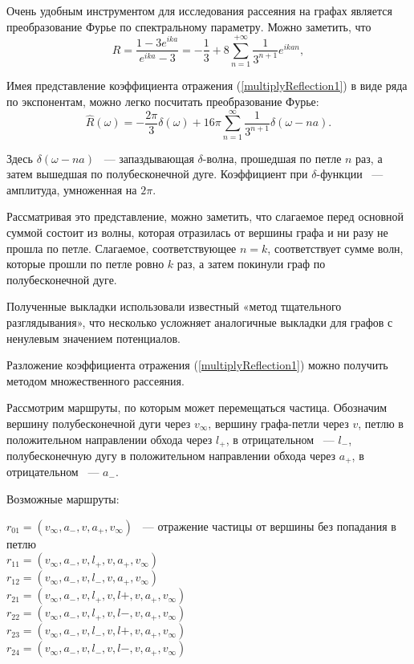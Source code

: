 \documentclass[a4 paper, 12 pt]{extarticle}
\begin{document}
   Очень удобным инструментом для исследования рассеяния на графах является преобразование Фурье по спектральному параметру.
   Можно заметить, что \[  R = \frac{1-3e^{ika}}{e^{ika}-3} = -\frac{1}{3} + 8 \sum_{n=1}^{+\infty}\frac{1}{3^{n+1}}e^{ikan},\]
   
   Имея представление коэффициента отражения (\ref{multiplyReflection1}) в виде ряда по экспонентам, можно легко посчитать преобразование Фурье:
   \[\widehat{R}(\omega)=-\frac{2\pi}{3}\delta(\omega)+16\pi\sum_{n=1}^{\infty}\frac{1}{3^{n+1}}\delta(\omega-na).\]
   
   Здесь $\delta\left(\omega -na\right)$ ~--- запаздывающая $\delta$-волна, прошедшая по петле $n$ раз, а затем вышедшая по полубесконечной дуге. Коэффициент при $\delta$-функции ~--- амплитуда, умноженная на $2\pi$.
   
   Рассматривая это представление, можно заметить, что слагаемое перед основной суммой состоит из волны, которая отразилась от вершины графа и ни разу не прошла по петле. Слагаемое, соответствующее $n=k$, соответствует сумме волн, которые прошли по петле ровно $k$ раз, а затем покинули граф по полубесконечной дуге.
   
   Полученные выкладки использовали известный «метод тщательного разглядывания», что несколько усложняет аналогичные выкладки для графов с ненулевым значением потенциалов.
   \pagebreak
   
   Разложение коэффициента отражения (\ref{multiplyReflection1}) можно получить методом множественного рассеяния.
   
   Рассмотрим маршруты, по которым может перемещаться частица. Обозначим вершину полубесконечной дуги через $v_\infty$, вершину графа-петли через $v$, петлю в положительном направлении обхода через $l_+$, в отрицательном ~--- $l_-$, полубесконечную дугу в положительном направлении обхода через $a_+$, в отрицательном ~--- $a_-$.
   
   Возможные маршруты:

   \begin{table}[!htb]
   	$r_{01} = \left(v_\infty,a_-,v,a_+,v_\infty\right)$ ~--- отражение частицы от вершины без попадания в петлю \\
   	$r_{11} = \left(v_\infty,a_-,v,l_+,v,a_+,v_\infty\right)$ \\
   	$r_{12} = \left(v_\infty,a_-,v,l_-,v,a_+,v_\infty\right)$ \\
   	$r_{21} = \left(v_\infty,a_-,v,l_+,v,l+,v,a_+,v_\infty\right)$ \\
   	$r_{22} = \left(v_\infty,a_-,v,l_+,v,l-,v,a_+,v_\infty\right)$   \\
   	$r_{23} = \left(v_\infty,a_-,v,l_-,v,l+,v,a_+,v_\infty\right)$ \\
   	$r_{24} = \left(v_\infty,a_-,v,l_-,v,l-,v,a_+,v_\infty\right)$ \\
   \end{table}
\end{document}
